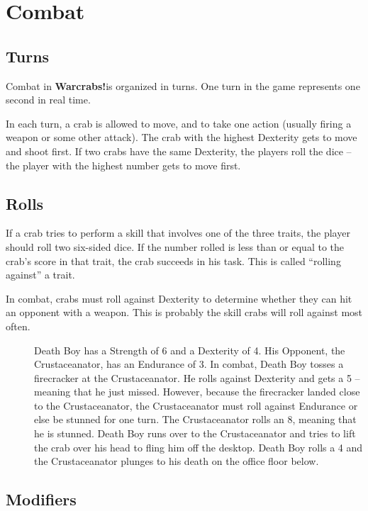 \documentclass[a4paper,10pt]{article}
\newcommand{\warcrabs}{\textbf{Warcrabs!}}
\begin{document}
\section*{Combat}
\label{sec:Combat}
\subsection*{Turns}
\label{sec:Turns}

Combat in \warcrabs\hspace*{4pt}is organized in turns. One turn in the game represents one second in real time.

In each turn, a crab is allowed to move, and to take one action (usually firing a weapon or some other attack). The crab with the highest Dexterity gets to move and shoot first. If two crabs have the same Dexterity, the players roll the dice -- the player with the highest number gets to move first.

\subsection*{Rolls}
\label{sec:Rolls}
If a crab tries to perform a skill that involves one of the three traits, the player should roll two six-sided dice. If the number rolled is less than or equal to the crab's score in that trait, the crab succeeds in his task. This is called ``rolling against'' a trait.

In combat, crabs must roll against Dexterity to determine whether they can hit an opponent with a weapon. This is probably the skill crabs will roll against most often.

\begin{description}
 \item[] Death Boy has a Strength of 6 and a Dexterity of 4. His Opponent, the Crustaceanator, has an Endurance of 3. In combat, Death Boy tosses a firecracker at the Crustaceanator. He rolls against Dexterity and gets a 5 -- meaning that he just missed. However, because the firecracker landed close to the Crustaceanator, the Crustaceanator must roll against Endurance or else be stunned for one turn. The Crustaceanator rolls an 8, meaning that he is stunned. Death Boy runs over to the Crustaceanator and tries to lift the crab over his head to fling him off the desktop. Death Boy rolls a 4 and the Crustaceanator plunges to his death on the office floor below.
 \end{description}

\subsection*{Modifiers}
\label{sec:Modifiers}
\end{document}
